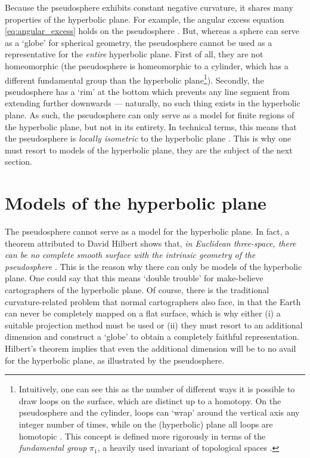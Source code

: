 Because the pseudosphere exhibits constant negative curvature, it shares many properties of the hyperbolic plane. For example, the angular excess equation \cref{eq:angular_excess} holds on the pseudosphere \cite{Needham1997}. But, whereas a sphere can serve as a `globe' for spherical geometry, the pseudosphere cannot be used as a representative for the \emph{entire} hyperbolic plane. First of all, they are not homeomorphic (the pseudosphere is homeomorphic to a cylinder, which has a different fundamental group than the hyperbolic plane\footnote{Intuitively, one can see this as the number of different ways it is possible to draw loops on the surface, which are distinct up to a homotopy. On the pseudosphere and the cylinder, loops can `wrap' around the vertical axis any integer number of times, while on the (hyperbolic) plane all loops are homotopic \cite{Lee2000}. This concept is defined more rigorously in terms of the \emph{fundamental group} \(\pi_1\), a heavily used invariant of topological spaces \cite{Schuller2014}.}). Secondly, the pseudosphere has a `rim' at the bottom which prevents any line segment from extending further downwards --- naturally, no such thing exists in the hyperbolic plane. As such, the pseudosphere can only serve as a model for finite regions of the hyperbolic plane, but not in its entirety. In technical terms, this means that the pseudosphere is \emph{locally isometric} to the hyperbolic plane \cite{Ghys2010}. This is why one must resort to models of the hyperbolic plane, they are the subject of the next section.

\section{Models of the hyperbolic plane}
\label{sec:hyperbolic_models}
The pseudosphere cannot serve as a model for the hyperbolic plane. In fact, a theorem attributed to David Hilbert shows that, \emph{in Euclidean three-space, there can be no complete smooth surface with the intrinsic geometry of the pseudosphere} \cite{Thurston1997}. This is the reason why there can only be models of the hyperbolic plane. One could say that this means `double trouble' for make-believe cartographers of the hyperbolic plane. Of course, there is the traditional curvature-related problem that normal cartographers also face, in that the Earth can never be completely mapped on a flat surface, which is why either (i) a suitable projection method must be used or (ii) they must resort to an additional dimension and construct a `globe' to obtain a completely faithful representation. Hilbert's theorem implies that even the additional dimension will be to no avail for the hyperbolic plane, as illustrated by the pseudosphere.

